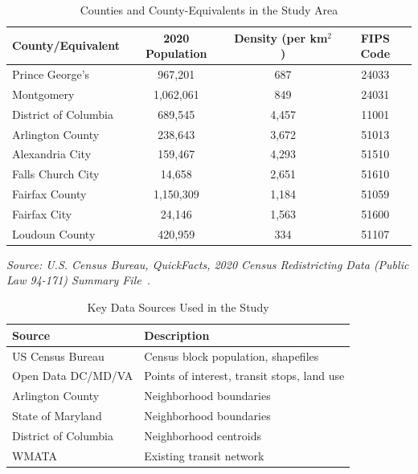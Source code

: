 \documentclass[sigconf,nonacm]{acmart}
\begin{document}


\begin{table}[h]
\caption{Counties and County-Equivalents in the Study Area}
\label{tab:counties}
\begin{tabular}{lccc}
\toprule
County/Equivalent & 2020 Population & Density (per km$^2$) & FIPS Code \\
\midrule
Prince George's & 967,201 & 687 & 24033 \\
Montgomery & 1,062,061 & 849 & 24031 \\
District of Columbia & 689,545 & 4,457 & 11001 \\
Arlington County & 238,643 & 3,672 & 51013 \\
Alexandria City & 159,467 & 4,293 & 51510 \\
Falls Church City & 14,658 & 2,651 & 51610 \\
Fairfax County & 1,150,309 & 1,184 & 51059 \\
Fairfax City & 24,146 & 1,563 & 51600 \\
Loudoun County & 420,959 & 334 & 51107 \\
\bottomrule
\end{tabular}
\end{table}

\noindent\textit{Source: U.S. Census Bureau, QuickFacts, 2020 Census Redistricting Data (Public Law 94-171) Summary File~\cite{lit:census}.} 


\begin{table}[h]
\caption{Key Data Sources Used in the Study}
\label{tab:datasources}
\begin{tabular}{ll}
\toprule
Source & Description \\
\midrule
US Census Bureau & Census block population, shapefiles \\
Open Data DC/MD/VA & Points of interest, transit stops, land use \\
Arlington County & Neighborhood boundaries \\
State of Maryland & Neighborhood boundaries \\
District of Columbia & Neighborhood centroids \\
WMATA & Existing transit network \\
\bottomrule
\end{tabular}
\end{table}
\end{document}
